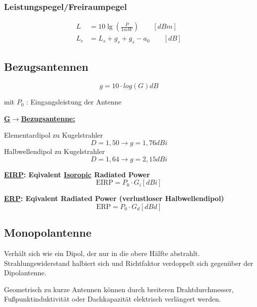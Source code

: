 \subsubsection{Leistungspegel/Freiraumpegel}
\begin{align*}
    L      & = 10 \lg \left(\frac{P}{1 \si{mW}}\right) \qquad [\si{dBm}] \\
    L_{e} & = L_{s}+g_{s}+g_{s}-a_{0} \qquad [\si{dB}]
\end{align*}

\subsection{Bezugsantennen}
\[
\boxed{g = 10 \cdot log(G) \si{dB}}
\]

mit $P_0$ : Eingangsleistung der Antenne

\begin{description}
	\item \textbf{\underline{G$\rightarrow$Bezugsantenne:}}
	
	Elementardipol  zu Kugelstrahler \[D = 1,50 \rightarrow g = 1,76\si{dBi}\]
	Halbwellendipol zu Kugelstrahler \[D = 1,64 \rightarrow g = 2,15\si{dBi}\]
	
	\item \textbf{\underline{EIRP}: Eqivalent \underline{Isoropic} Radiated Power}
	\[
	\text{EIRP} = P_0 \cdot G_i [\si{dBi}]
	\]
	
	\item \textbf{\underline{ERP}: Eqivalent Radiated Power (verlustloser Halbwellendipol)}
	\[
	\text{ERP} = P_0 \cdot G_d [\si{dBd}]
	\]
\end{description} 

\subsection{Monopolantenne}
Verhält sich wie ein Dipol, der nur in die obere Hälfte abstrahlt. 	Strahlungswiderstand halbiert sich und Richtfaktor verdoppelt sich gegenüber der Dipolantenne.

Geometrisch zu kurze Antennen können durch breiteren Drahtdurchmesser, Fußpunktinduktivität oder Dachkapazität elektrisch verlängert werden.